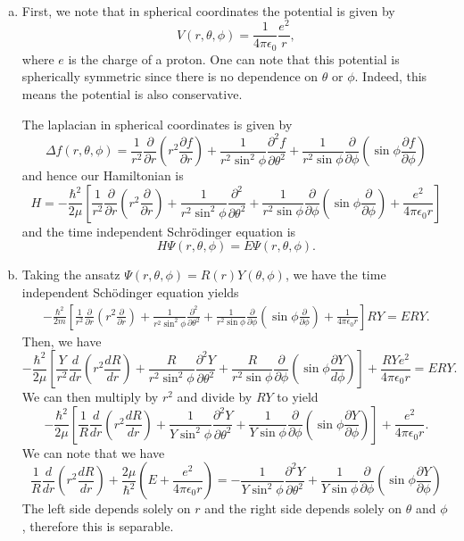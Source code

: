 \documentclass[12pt]{article} %
\begin{document}
\begin{solution}~
\begin{enumerate}[(a)]
    \item First, we note that in spherical coordinates the potential is given by
    \[
    V(r,\theta,\phi) = \frac{1}{4\pi \epsilon_0} \frac{e^2}{r},
    \]
    where $e$ is the charge of a proton. One can note that this potential is spherically symmetric since there is no dependence on $\theta$ or $\phi$. Indeed, this means the potential is also conservative.

    The laplacian in spherical coordinates is given by
    \[
        \Delta f(r,\theta,\phi) = \frac{1}{r^2} \frac{\partial}{\partial r} \left(r^2 \frac{\partial f}{\partial r}\right)+\frac{1}{r^2 \sin^2 \phi} \frac{\partial^2 f}{\partial \theta^2} + \frac{1}{r^2 \sin\phi}\frac{\partial}{\partial \phi} \left(\sin \phi \frac{\partial f}{\partial \phi}\right)
    \]
and hence our Hamiltonian is 
\[
H = -\frac{\hbar^2}{2\mu} \left[\frac{1}{r^2} \frac{\partial}{\partial r} \left(r^2 \frac{\partial }{\partial r}\right)+\frac{1}{r^2 \sin^2 \phi} \frac{\partial^2 }{\partial \theta^2} + \frac{1}{r^2 \sin\phi}\frac{\partial}{\partial \phi} \left(\sin \phi \frac{\partial }{\partial \phi}\right) + \frac{e^2}{4\pi \epsilon_0 r}\right]
\]
and the time independent Schr\"odinger equation is
\[
H \Psi(r,\theta,\phi) = E \Psi(r,\theta,\phi).
\]
\item Taking the ansatz $\Psi(r,\theta,\phi) = R(r)Y(\theta,\phi)$, we have the time independent Sch\"odinger equation yields
\begin{align*}
-\frac{\hbar^2}{2m} \left[\frac{1}{r^2} \frac{\partial}{\partial r} \left(r^2 \frac{\partial }{\partial r}\right)+\frac{1}{r^2 \sin^2 \phi} \frac{\partial^2 }{\partial \theta^2} + \frac{1}{r^2 \sin\phi}\frac{\partial}{\partial \phi} \left(\sin \phi \frac{\partial }{\partial \phi}\right) + \frac{1}{4\pi \epsilon_0 r}\right] RY = E RY.
\end{align*}
Then, we have
\[
-\frac{\hbar^2}{2\mu} \left[  \frac{Y}{r^2} \frac{d}{dr} \left(r^2 \frac{d R}{dr}\right) +\frac{R}{r^2 \sin^2\phi} \frac{\partial^2 Y}{\partial\theta^2} + \frac{R}{r^2 \sin\phi} \frac{\partial}{\partial \phi}\left(\sin \phi \frac{\partial Y}{d\phi}\right)\right] + \frac{RY e^2}{4\pi \epsilon_0 r} = ERY.
\]
We can then multiply by $r^2$ and divide by $RY$ to yield
\[
-\frac{\hbar^2}{2\mu} \left[  \frac{1}{R} \frac{d}{dr} \left(r^2 \frac{d R}{dr}\right) +\frac{1}{Y \sin^2\phi} \frac{\partial^2 Y}{\partial \theta^2} + \frac{1}{Y \sin\phi} \frac{\partial}{\partial\phi}\left(\sin \phi \frac{\partial Y}{\partial \phi}\right)\right] + \frac{e^2}{4\pi \epsilon_0 r}.
\]
We can note that we have
\[
\frac{1}{R} \frac{d}{dr} \left(r^2 \frac{d R}{dr}\right) + \frac{2 \mu}{\hbar^2} \left(E + \frac{e^2}{4\pi \epsilon_0 r}\right) = -\frac{1}{Y \sin^2\phi} \frac{\partial^2 Y}{\partial \theta^2} + \frac{1}{Y \sin\phi} \frac{\partial}{\partial\phi}\left(\sin \phi \frac{\partial Y}{\partial \phi}\right)
\]
The left side depends solely on $r$ and the right side depends solely on $\theta$ and $\phi$, therefore this is separable.
\end{enumerate}
\end{solution}
\end{document}
